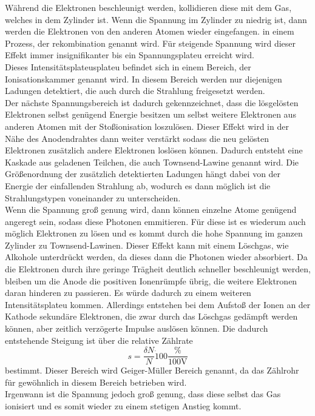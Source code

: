 \noindent Während die Elektronen beschleunigt werden, kollidieren diese mit dem Gas, welches in dem  Zylinder ist.
Wenn die Spannung im Zylinder zu niedrig ist, dann werden die Elektronen von den anderen Atomen wieder eingefangen.
in einem Prozess, der rekombination genannt wird. Für steigende Spannung wird dieser Effekt immer insignifikanter bis
ein Spannungsplateu erreicht wird. \\
\noindent Dieses Intensitätsplateusplateu befindet sich in einem Bereich, der Ionisationskammer genannt wird. In diesem Bereich
werden nur diejenigen Ladungen detektiert, die auch durch die Strahlung freigesetzt werden.\\
\noindent Der nächste Spannungsbereich ist dadurch gekennzeichnet, dass die lösgelösten Elektronen selbst genügend Energie
besitzen um selbst weitere Elektronen aus anderen Atomen mit der Stoßionisation loszulösen. Dieser Effekt wird in der 
Nähe des Anodendrahtes dann weiter verstärkt sodass die neu gelösten Elektronen zusätzlich andere Elektronen loslösen
können. Dadurch entsteht eine Kaskade aus geladenen Teilchen, die auch Townsend-Lawine genannt wird. Die Größenordnung
der zusätzlich detektierten Ladungen hängt dabei von der Energie der einfallenden Strahlung ab, wodurch es dann möglich
ist die Strahlungstypen voneinander zu unterscheiden.\\
\noindent Wenn die Spannung groß genung wird, dann können einzelne Atome genügend angeregt sein, sodass diese Photonen
emmitieren. Für diese ist es wiederum auch möglich Elektronen zu lösen und es kommt durch die hohe Spannung im ganzen
Zylinder zu Townsend-Lawinen. Dieser Effekt kann mit einem Löschgas, wie Alkohole unterdrückt werden, da dieses dann die
Photonen wieder absorbiert.  Da die Elektronen durch ihre geringe Trägheit deutlich schneller beschleunigt werden,
bleiben um die Anode die positiven Ionenrümpfe übrig, die weitere Elektronen daran hinderen zu passieren. Es würde dadurch 
zu einem weiteren Intensitätsplateu kommen. Allerdings entstehen bei dem Aufstoß der Ionen an der Kathode sekundäre
Elektronen, die zwar durch das Löschgas gedämpft werden können, aber zeitlich verzögerte Impulse auslösen können.
Die dadurch entstehende Steigung ist über die relative Zählrate
\begin{equation}
    s=\frac{\delta N}{N} \dot 100\frac{\unit{\percent}}{100\unit{\volt}}
    \label{eqn:relativ}
\end{equation}
bestimmt. Dieser Bereich wird Geiger-Müller Bereich genannt, da das Zählrohr für gewöhnlich in diesem Bereich betrieben wird.\\
\noindent Irgenwann ist die Spannung jedoch groß genung, dass diese selbst das Gas ionisiert und es somit wieder zu einem 
stetigen Anstieg kommt.\\

